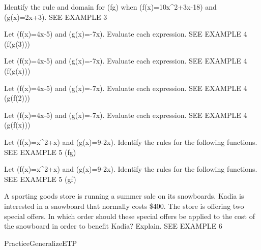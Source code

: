 \documentclass{article}
\newenvironment{practice}[2]{}{}        %
\newenvironment{te-addendum}[2]{}{}     %
\newcommand{\answer}[1]{}               %
\newcommand{\placeholder}[2]{}          %
\newcommand{\te}[1]{}                   %
\begin{document}
\begin{practice}{23}{1}
Identify the rule and domain for (\frac fg) when (f(x)=10x^2+3x-18) and (g(x)=2x+3). SEE EXAMPLE 3
\answer{((\frac fg)(x)=5x-6) for all real numbers x, such that (x\neq-\frac32)}
\end{practice}
\begin{practice}{24}{1}
Let (f(x)=4x-5) and (g(x)=-7x). Evaluate each expression. SEE EXAMPLE 4
(f(g(3)))
\answer{-89}
\end{practice}
\begin{practice}{25}{1}
Let (f(x)=4x-5) and (g(x)=-7x). Evaluate each expression. SEE EXAMPLE 4
(f(g(x)))
\answer{(-28x-5)}
\end{practice}
\begin{practice}{26}{1}
Let (f(x)=4x-5) and (g(x)=-7x). Evaluate each expression. SEE EXAMPLE 4
(g(f(2)))
\answer{-21}
\end{practice}
\begin{practice}{27}{1}
Let (f(x)=4x-5) and (g(x)=-7x). Evaluate each expression. SEE EXAMPLE 4
(g(f(x)))
\answer{(-28x+35)}
\end{practice}
\begin{practice}{28}{1}
Let (f(x)=x^2+x) and (g(x)=9-2x). Identify the rules for the following functions. SEE EXAMPLE 5
(f\circ g)
\answer{(4x^2-38x+90)}
\end{practice}
\begin{practice}{29}{1}
Let (f(x)=x^2+x) and (g(x)=9-2x). Identify the rules for the following functions. SEE EXAMPLE 5
(g\circ f)
\answer{(-2x^2-2x+9)}
\end{practice}
\begin{practice}{30}{2}
A sporting goods store is running a summer sale on its snowboards. Kadia is interested in a snowboard that normally costs \$400. The store is offering two special offers.
In which order should these special offers be applied to the cost of the snowboard in order to benefit Kadia? Explain. SEE EXAMPLE 6
\placeholder{illustration}{Snowboards in a store display, central blue/white board labeled 58. Circular offers at bottom: 50 dollars INSTANT REBATE; 10 percent DISCOUNT.}
\answer{It is better for Kadia if the 10\% discount is applied before the \$50 instant rebate because he will save \$5 more.}
\te{Answer printed on PDF page 73.}
\end{practice}
\begin{te-addendum}{Practice}{GeneralizeETP}
\te{Practice \& Problem Solving is available at SavvasRealize.com. Answers for 17--18, 22--23, and 30 are transcribed with their items.}
\end{te-addendum}
\end{document}
